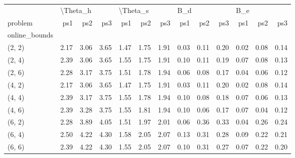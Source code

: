 \begin{tabular}{lrrrrrrrrrrrr}
\toprule
{} & \multicolumn{3}{l}{\textbackslash Theta\_h} & \multicolumn{3}{l}{\textbackslash Theta\_s} & \multicolumn{3}{l}{B\_d} & \multicolumn{3}{l}{B\_e} \\
problem &      ps1 &  ps2 &  ps3 &      ps1 &  ps2 &  ps3 &  ps1 &  ps2 &  ps3 &  ps1 &  ps2 &  ps3 \\
online\_bounds &          &      &      &          &      &      &      &      &      &      &      &      \\
\midrule
(2, 2)        &     2.17 & 3.06 & 3.65 &     1.47 & 1.75 & 1.91 & 0.03 & 0.11 & 0.20 & 0.02 & 0.08 & 0.14 \\
(2, 4)        &     2.39 & 3.06 & 3.65 &     1.55 & 1.75 & 1.91 & 0.10 & 0.11 & 0.19 & 0.07 & 0.08 & 0.13 \\
(2, 6)        &     2.28 & 3.17 & 3.75 &     1.51 & 1.78 & 1.94 & 0.06 & 0.08 & 0.17 & 0.04 & 0.06 & 0.12 \\
(4, 2)        &     2.17 & 3.06 & 3.65 &     1.47 & 1.75 & 1.91 & 0.03 & 0.11 & 0.20 & 0.02 & 0.08 & 0.14 \\
(4, 4)        &     2.39 & 3.17 & 3.75 &     1.55 & 1.78 & 1.94 & 0.10 & 0.08 & 0.18 & 0.07 & 0.06 & 0.13 \\
(4, 6)        &     2.39 & 3.28 & 3.75 &     1.55 & 1.81 & 1.94 & 0.10 & 0.06 & 0.17 & 0.07 & 0.04 & 0.12 \\
(6, 2)        &     2.28 & 3.89 & 4.05 &     1.51 & 1.97 & 2.01 & 0.06 & 0.36 & 0.33 & 0.04 & 0.26 & 0.24 \\
(6, 4)        &     2.50 & 4.22 & 4.30 &     1.58 & 2.05 & 2.07 & 0.13 & 0.31 & 0.28 & 0.09 & 0.22 & 0.21 \\
(6, 6)        &     2.39 & 4.22 & 4.30 &     1.55 & 2.05 & 2.07 & 0.10 & 0.31 & 0.27 & 0.07 & 0.22 & 0.20 \\
\bottomrule
\end{tabular}

